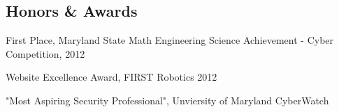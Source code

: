 \documentclass[a4paper,margin,line,11pt]{resume}
\newcommand{\rurl}[1]{\hfill {\footnotesize \url{#1}}}
\begin{document}
\begin{resume}
\section{\mysidestyle Honors \& Awards}
	\begin{asparablank}
		\item First Place, Maryland State Math Engineering Science Achievement - Cyber Competition, 2012
		\item Website Excellence Award, FIRST Robotics 2012
		\item "Most Aspiring Security Professional", Unviersity of Maryland CyberWatch
	\end{asparablank}


\end{resume}
\end{document}
